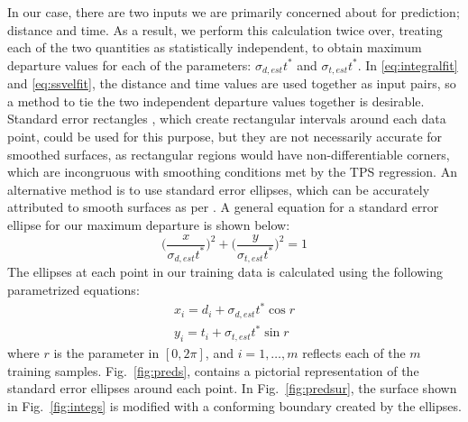 \documentclass[letterpaper, 10 pt, conference]{ieeeconf}  %
\begin{document}
In our case, there are two inputs we are primarily concerned about for prediction; distance and time. As a result, we perform this calculation twice over, treating each of the two quantities as statistically independent, to obtain maximum departure values for each of the parameters: $\sigma_{d,est}t^*$ and $\sigma_{t,est}t^*$. In \eqref{eq:integralfit} and \eqref{eq:ssvelfit}, the distance and time values are used together as input pairs, so a method to tie the two independent departure values together is desirable. Standard error rectangles \cite{stdellipse}, which create rectangular intervals around each data point, could be used for this purpose, but they are not necessarily accurate for smoothed surfaces, as rectangular regions would have non-differentiable corners, which are incongruous with smoothing conditions met by the TPS regression. An alternative method is to use standard error ellipses, which can be accurately attributed to smooth surfaces as per \cite{stdellipse}. A general equation for a standard error ellipse for our maximum departure is shown below:
\begin{equation}
    \bigg(\frac{x}{\sigma_{d,est}t^*}\bigg)^2 + \bigg(\frac{y}{\sigma_{t,est}t^*}\bigg)^2 = 1
\end{equation}
The ellipses at each point in our training data is calculated using the following parametrized equations:
\begin{align} \label{eq:bounds}
    x_i = d_i + \sigma_{d,est}t^*\cos{r} \nonumber \\
    y_i = t_i + \sigma_{t,est}t^*\sin{r} 
\end{align}
where $r$ is the parameter in $[0,2\pi]$, and $i = 1,\ldots,m$ reflects each of the $m$ training samples. Fig.~\ref{fig:preds}, contains a pictorial representation of the standard error ellipses around each point. In Fig.~\ref{fig:predsur}, the surface shown in Fig.~\ref{fig:integs} is modified with a conforming boundary \cite{bounds} created by the ellipses.
\end{document}
